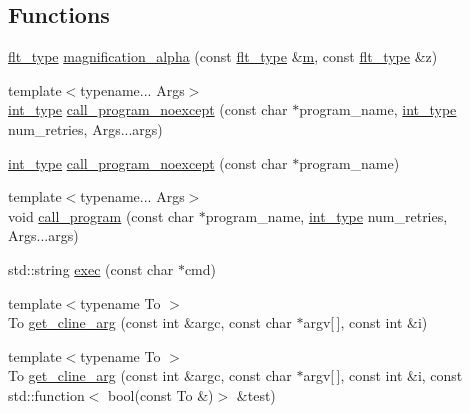 \subsection*{Functions}
\begin{DoxyCompactItemize}
\item 
\hyperlink{lib_2IceBRG__main_2common_8h_ad0f130a56eeb944d9ef2692ee881ecc4}{flt\-\_\-type} \hyperlink{namespaceIceBRG_ab587729cb9260a99134b08c6c2225656}{magnification\-\_\-alpha} (const \hyperlink{lib_2IceBRG__main_2common_8h_ad0f130a56eeb944d9ef2692ee881ecc4}{flt\-\_\-type} \&\hyperlink{namespaceIceBRG_ada6365c5d16106f0608afbd34f010bcc}{m}, const \hyperlink{lib_2IceBRG__main_2common_8h_ad0f130a56eeb944d9ef2692ee881ecc4}{flt\-\_\-type} \&z)
\item 
{\footnotesize template$<$typename... Args$>$ }\\\hyperlink{lib_2IceBRG__main_2common_8h_ac4de9d9335536ac22821171deec8d39e}{int\-\_\-type} \hyperlink{namespaceIceBRG_a787c194c18a920c51d124701a10b099b}{call\-\_\-program\-\_\-noexcept} (const char $\ast$program\-\_\-name, \hyperlink{lib_2IceBRG__main_2common_8h_ac4de9d9335536ac22821171deec8d39e}{int\-\_\-type} num\-\_\-retries, Args...\-args)
\item 
\hyperlink{lib_2IceBRG__main_2common_8h_ac4de9d9335536ac22821171deec8d39e}{int\-\_\-type} \hyperlink{namespaceIceBRG_a12c66268892e5e8f2f380bf90faab6e4}{call\-\_\-program\-\_\-noexcept} (const char $\ast$program\-\_\-name)
\item 
{\footnotesize template$<$typename... Args$>$ }\\void \hyperlink{namespaceIceBRG_a705a3bbc26675b984251b60e8096c776}{call\-\_\-program} (const char $\ast$program\-\_\-name, \hyperlink{lib_2IceBRG__main_2common_8h_ac4de9d9335536ac22821171deec8d39e}{int\-\_\-type} num\-\_\-retries, Args...\-args)
\item 
std\-::string \hyperlink{namespaceIceBRG_aca768403716d346762c67bcadb91e583}{exec} (const char $\ast$cmd)
\item 
{\footnotesize template$<$typename To $>$ }\\To \hyperlink{namespaceIceBRG_a2bff5d916867d1b6ebeee4103079781f}{get\-\_\-cline\-\_\-arg} (const int \&argc, const char $\ast$argv\mbox{[}$\,$\mbox{]}, const int \&i)
\item 
{\footnotesize template$<$typename To $>$ }\\To \hyperlink{namespaceIceBRG_a5221e1eae3598f8a7231dad7024ca213}{get\-\_\-cline\-\_\-arg} (const int \&argc, const char $\ast$argv\mbox{[}$\,$\mbox{]}, const int \&i, const std\-::function$<$ bool(const To \&)$>$ \&test)

\end{DoxyCompactItemize}
